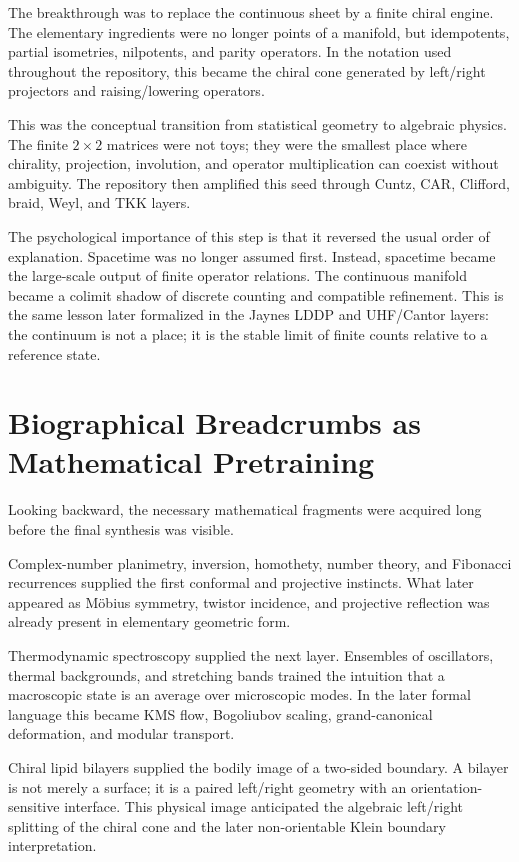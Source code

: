 The breakthrough was to replace the continuous sheet by a finite chiral engine.
The elementary ingredients were no longer points of a manifold, but idempotents,
partial isometries, nilpotents, and parity operators.  In the notation used
throughout the repository, this became the chiral cone generated by left/right
projectors and raising/lowering operators.

This was the conceptual transition from statistical geometry to algebraic
physics.  The finite $2\times2$ matrices were not toys; they were the smallest
place where chirality, projection, involution, and operator multiplication can
coexist without ambiguity.  The repository then amplified this seed through
Cuntz, CAR, Clifford, braid, Weyl, and TKK layers.

The psychological importance of this step is that it reversed the usual order
of explanation.  Spacetime was no longer assumed first.  Instead, spacetime
became the large-scale output of finite operator relations.  The continuous
manifold became a colimit shadow of discrete counting and compatible refinement.
This is the same lesson later formalized in the Jaynes LDDP and UHF/Cantor
layers: the continuum is not a place; it is the stable limit of finite counts
relative to a reference state.

\section{Biographical Breadcrumbs as Mathematical Pretraining}

Looking backward, the necessary mathematical fragments were acquired long
before the final synthesis was visible.

Complex-number planimetry, inversion, homothety, number theory, and Fibonacci
recurrences supplied the first conformal and projective instincts.  What later
appeared as M\"obius symmetry, twistor incidence, and projective reflection was
already present in elementary geometric form.

Thermodynamic spectroscopy supplied the next layer.  Ensembles of oscillators,
thermal backgrounds, and stretching bands trained the intuition that a
macroscopic state is an average over microscopic modes.  In the later formal
language this became KMS flow, Bogoliubov scaling, grand-canonical deformation,
and modular transport.

Chiral lipid bilayers supplied the bodily image of a two-sided boundary.  A
bilayer is not merely a surface; it is a paired left/right geometry with an
orientation-sensitive interface.  This physical image anticipated the algebraic
left/right splitting of the chiral cone and the later non-orientable Klein
boundary interpretation.


